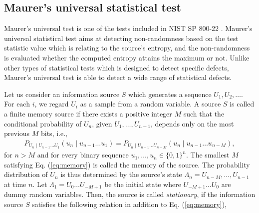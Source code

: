\subsection{Maurer's universal statistical test}
Maurer's universal test is one of the tests included in NIST SP 800-22 \cite{rukhin2001statistical,bassham2010sp}.
Maurer's universal statistical test aims at detecting non-randomness based on the test statistic value which is relating to the source's entropy, and the non-randomness is evaluated whether the computed entropy attains the maximum or not. 
%
Unlike other types of statistical tests which is designed to detect specific defects, Maurer's universal test is able to detect a wide range of statistical defects.
%
\par
Let us consider an information source $S$ which generates a sequence $U_1,U_2,\dots$. For each $i$, we regard $U_i$ as a sample from a random variable.
A source $S$ is called a finite memory source if there exists a positive integer $M$ such that the conditional probability of $U_n$, given $U_1,\dots,U_{n-1}$, depends only on the most previous $M$ bits, i.e.,
\begin{align}\label{eq:memory}
	P_{U_n\mid U_{n-1}\dots U_{1}}(u_n \mid u_{n-1}\dots u_{1}) = P_{U_n\mid U_{n-1}\dots U_{n-M}}(u_n \mid u_{n-1}\dots u_{n-M}),
\end{align}
for $n>M$ and for every binary sequence $u_1,\dots,u_n\in\{0,1\}^n$. The smallest $M$ satisfying Eq. (\ref{eq:memory}) is called the memory of the source. The probability distribution of $U_n$ is thus determined by the source's state $\Lambda_n = U_{n-M},\dots,U_{n-1}$ at time $n$. Let $\Lambda_1 = U_0 \dots U_{-M+1}$ be the initial state where $U_{-M+1}\dots U_0$ are dummy random variables. Then, the source is called \textit{stationary}, if the information source $S$ satisfies the following relation in addition to Eq. (\ref{eq:memory}),
